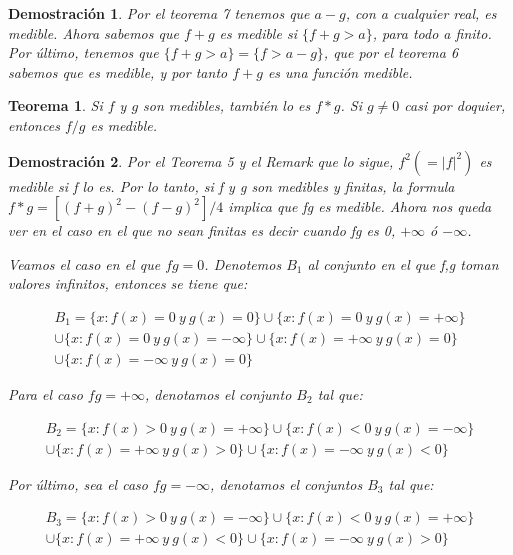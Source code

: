 \documentclass{article}
\newtheorem{theorem}{Teorema}
\newtheorem{demostration}{Demostración}
\begin{document}
\begin{demostration}
Por el teorema 7 tenemos que $a - g$, con a cualquier real, es medible. Ahora sabemos que $f + g$ es medible si $\{f + g > a\}$, para todo a finito. Por último, tenemos que $\{f + g > a\} = \{f > a - g\}$, que por el teorema 6 sabemos que es medible, y por tanto $f + g$ es una función medible.
\end{demostration}

\begin{theorem}
Si $f$ y $g$ son medibles, también lo es $f*g$. Si $g \neq 0$ casi por doquier, entonces $f/g$ es medible.
\end{theorem}

\begin{demostration}
Por el Teorema 5 y el Remark que lo sigue, $f^2(=|f|^2)$ es medible si f lo es. Por lo tanto, si f y g son medibles y finitas, la formula $f*g=[(f+g)^2 - (f-g)^2]/4$ implica que fg es medible. Ahora nos queda ver en el caso en el que no sean finitas es decir cuando fg es 0, $+\infty$ ó $-\infty$.

Veamos el caso en el que $fg=0$. Denotemos $B_1$ al conjunto en el que f,g toman valores infinitos, entonces se tiene que:

\begin{equation}
\begin{split}
B_1=\{x: f(x)=0 \> y \> g(x)=0\} \cup \{x: f(x)=0 \> y \> g(x)=+\infty\} \\
\cup \{x: f(x)=0 \> y \> g(x)=-\infty\} \cup \{x: f(x)=+\infty \> y \> g(x)=0\} \\
\cup \{x: f(x)=-\infty \> y \> g(x)=0\}
\end{split}
\end{equation}

Para el caso $fg=+\infty$, denotamos el conjunto $B_2$ tal que:

\begin{equation}
\begin{split}
B_2=\{x: f(x)>0 \> y \> g(x)=+\infty\} \cup \{x: f(x)<0 \> y \> g(x)=-\infty\} \\
\cup \{x: f(x)=+\infty \> y \> g(x)>0 \} \cup \{x: f(x)=-\infty \> y \> g(x)<0\}
\end{split}
\end{equation}

Por último, sea el caso $fg=-\infty$, denotamos el conjuntos $B_3$ tal que:

\begin{equation}
\begin{split}
B_3=\{x:f(x) > 0 \> y \> g(x)=-\infty\} \cup \{x: f(x) < 0 \> y \> g(x) = +\infty\} \\
\cup \{x:f(x)=+\infty \> y \> g(x) < 0\} \cup \{x: f(x)=-\infty \> y \> g(x)>0\}
\end{split}
\end{equation}


\end{demostration}
\end{document}
